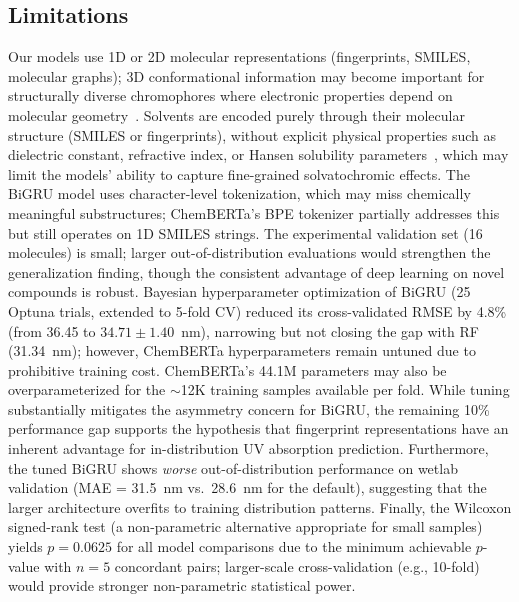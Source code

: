 \documentclass[11pt,a4paper]{article}
\begin{document}
\subsection*{Limitations}
Our models use 1D or 2D molecular representations (fingerprints, SMILES, molecular graphs); 3D conformational information may become important for structurally diverse chromophores where electronic properties depend on molecular geometry~\cite{lupopasini2023excited}.
Solvents are encoded purely through their molecular structure (SMILES or fingerprints), without explicit physical properties such as dielectric constant, refractive index, or Hansen solubility parameters~\cite{reichardt2011solvents}, which may limit the models' ability to capture fine-grained solvatochromic effects.
The BiGRU model uses character-level tokenization, which may miss chemically meaningful substructures; ChemBERTa's BPE tokenizer partially addresses this but still operates on 1D SMILES strings.
The experimental validation set (16 molecules) is small; larger out-of-distribution evaluations would strengthen the generalization finding, though the consistent advantage of deep learning on novel compounds is robust.
Bayesian hyperparameter optimization of BiGRU (25 Optuna trials, extended to 5-fold CV) reduced its cross-validated RMSE by 4.8\% (from 36.45 to $34.71 \pm 1.40$~nm), narrowing but not closing the gap with RF (31.34~nm); however, ChemBERTa hyperparameters remain untuned due to prohibitive training cost.
ChemBERTa's 44.1M parameters may also be overparameterized for the $\sim$12K training samples available per fold.
While tuning substantially mitigates the asymmetry concern for BiGRU, the remaining 10\% performance gap supports the hypothesis that fingerprint representations have an inherent advantage for in-distribution UV absorption prediction.
Furthermore, the tuned BiGRU shows \textit{worse} out-of-distribution performance on wetlab validation (MAE = 31.5~nm vs.\ 28.6~nm for the default), suggesting that the larger architecture overfits to training distribution patterns.
Finally, the Wilcoxon signed-rank test (a non-parametric alternative appropriate for small samples) yields $p = 0.0625$ for all model comparisons due to the minimum achievable $p$-value with $n = 5$ concordant pairs; larger-scale cross-validation (e.g., 10-fold) would provide stronger non-parametric statistical power.
\end{document}
